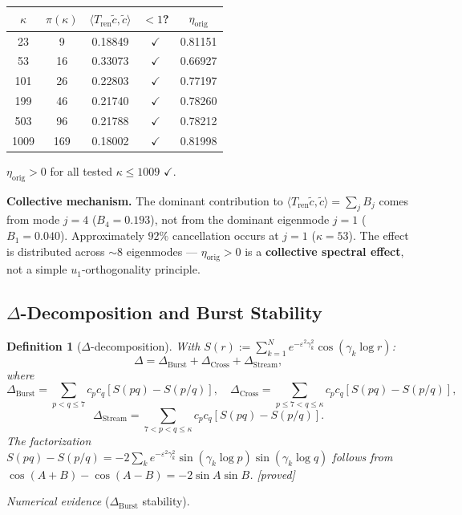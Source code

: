 \documentclass[11pt]{article}
\newtheorem{definition}[theorem]{Definition}
\newcommand{\etaorig}{\eta_{\mathrm{orig}}}
\newcommand{\Tren}{T_{\mathrm{ren}}}
\newcommand{\Dburstvar}{\Delta_{\mathrm{Burst}}}
\newcommand{\Dcross}{\Delta_{\mathrm{Cross}}}
\newcommand{\Dstream}{\Delta_{\mathrm{Stream}}}
\begin{document}
\begin{center}
\begin{tabular}{ccccc}
\toprule
$\kappa$ & $\pi(\kappa)$ & $\langle\Tren\tilde{c},\tilde{c}\rangle$
  & $< 1$? & $\etaorig$ \\
\midrule
23   & 9   & 0.18849 & $\checkmark$ & 0.81151 \\
53   & 16  & 0.33073 & $\checkmark$ & 0.66927 \\
101  & 26  & 0.22803 & $\checkmark$ & 0.77197 \\
199  & 46  & 0.21740 & $\checkmark$ & 0.78260 \\
503  & 96  & 0.21788 & $\checkmark$ & 0.78212 \\
1009 & 169 & 0.18002 & $\checkmark$ & 0.81998 \\
\bottomrule
\end{tabular}
\end{center}

$\etaorig > 0$ for all tested $\kappa\leq 1009$ $\checkmark$.

\textbf{Collective mechanism.}
The dominant contribution to $\langle\Tren\tilde{c},\tilde{c}\rangle
= \sum_j B_j$ comes from mode $j=4$ ($B_4=0.193$),
not from the dominant eigenmode $j=1$ ($B_1=0.040$).
Approximately $92\%$ cancellation occurs at $j=1$ ($\kappa=53$).
The effect is distributed across $\sim 8$ eigenmodes ---
$\etaorig > 0$ is a \textbf{collective spectral effect}, not a simple
$u_1$-orthogonality principle.

\subsection{$\Delta$-Decomposition and Burst Stability}

\begin{definition}[$\Delta$-decomposition]
With $S(r) := \sum_{k=1}^N e^{-\varepsilon^2\gamma_k^2}\cos(\gamma_k\log r)$:
\[
\Delta = \Dburstvar + \Dcross + \Dstream,
\]
where
\[
\Dburstvar = \sum_{p < q\leq 7}c_p c_q[S(pq)-S(p/q)],
\quad
\Dcross = \sum_{p\leq 7 < q\leq\kappa}c_p c_q[S(pq)-S(p/q)],
\]
\[
\Dstream = \sum_{7 < p < q\leq\kappa}c_p c_q[S(pq)-S(p/q)].
\]
The factorization
$S(pq)-S(p/q) = -2\sum_k e^{-\varepsilon^2\gamma_k^2}
\sin(\gamma_k\log p)\sin(\gamma_k\log q)$
follows from $\cos(A+B)-\cos(A-B) = -2\sin A\sin B$. [proved]
\end{definition}

\emph{Numerical evidence} ($\Dburstvar$ stability).
\end{document}
